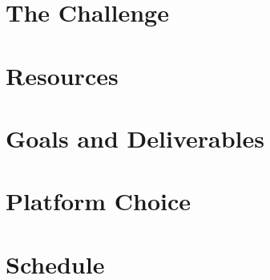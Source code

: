 \documentclass{article}
\begin{document}
\section*{The Challenge}

\section*{Resources}

\section*{Goals and Deliverables}

\section*{Platform Choice}

\section*{Schedule}
\end{document}
